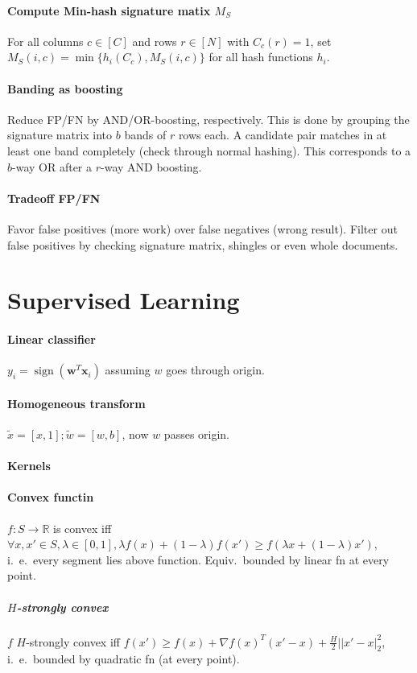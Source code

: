 \documentclass[a4paper, 9pt, DIV=24]{scrartcl}
\DeclareMathOperator{\sign}{sign}
\newcommand{\R}{\mathbb{R}}
\begin{document}
\begin{twocolumn}
\paragraph{Compute Min-hash signature matix $M_S$}
For all columns $c \in [C]$ and rows $r \in [N]$ with $C_c(r) = 1$, set $M_S(i,c) = \min\{h_i(C_c), M_S(i,c)\}$ for all hash functions $h_i$.


\paragraph{Banding as boosting} Reduce FP/FN by AND/OR-boosting, respectively. \newline
This is done by grouping the signature matrix into $b$ bands of $r$ rows each.
A candidate pair matches in at least one band completely (check through normal hashing). This corresponds to a $b$-way OR after a $r$-way AND boosting.

\paragraph{Tradeoff FP/FN} Favor false positives (more work) over false negatives (wrong result).
Filter out false positives by checking signature matrix, shingles or even whole documents.


\section{Supervised Learning}
\paragraph{Linear classifier} $y_i = \sign(\bm w^T\bm x_i)$ assuming $w$ goes through origin.
\paragraph{Homogeneous transform} $\tilde x = [x, 1]; \tilde w = [w, b]$, now $w$ passes origin.
\paragraph{Kernels}
\paragraph{Convex functin} $f: S \rightarrow \R$ is convex iff $\forall x,x'\in S, \lambda \in [0,1], \lambda f(x) + (1-\lambda)f(x') \geq f(\lambda x + (1-\lambda)x')$, i.\ e.\ every segment lies above function. Equiv.\ bounded by linear fn at every point.
\subparagraph{$H$-strongly convex} $f$ $H$-strongly convex iff $f(x') \geq f(x) + \nabla f(x)^T(x'-x)+\frac{H}{2}||x'-x|_2^2$, i.\ e.\ bounded by quadratic fn (at every point).

\end{twocolumn}
\end{document}
